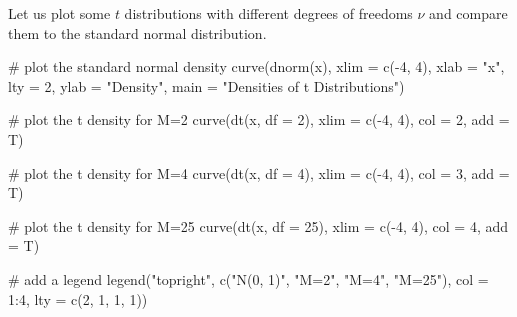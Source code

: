 \documentclass[
  letterpaper,
  DIV=11,
  numbers=noendperiod]{scrreprt}
\newenvironment{Shaded}{\begin{snugshade}}{\end{snugshade}}
\newcommand{\AttributeTok}[1]{\textcolor[rgb]{0.40,0.45,0.13}{#1}}
\newcommand{\CommentTok}[1]{\textcolor[rgb]{0.37,0.37,0.37}{#1}}
\newcommand{\DecValTok}[1]{\textcolor[rgb]{0.68,0.00,0.00}{#1}}
\newcommand{\FunctionTok}[1]{\textcolor[rgb]{0.28,0.35,0.67}{#1}}
\newcommand{\NormalTok}[1]{\textcolor[rgb]{0.00,0.23,0.31}{#1}}
\newcommand{\SpecialCharTok}[1]{\textcolor[rgb]{0.37,0.37,0.37}{#1}}
\newcommand{\StringTok}[1]{\textcolor[rgb]{0.13,0.47,0.30}{#1}}
\theoremstyle{definition}
\theoremstyle{plain}
\theoremstyle{plain}
\theoremstyle{remark}
\begin{document}
Let us plot some \(t\) distributions with different degrees of freedoms
\(\nu\) and compare them to the standard normal distribution.

\begin{Shaded}
\begin{Highlighting}[]
\CommentTok{\# plot the standard normal density}
\FunctionTok{curve}\NormalTok{(}\FunctionTok{dnorm}\NormalTok{(x), }
      \AttributeTok{xlim =} \FunctionTok{c}\NormalTok{(}\SpecialCharTok{{-}}\DecValTok{4}\NormalTok{, }\DecValTok{4}\NormalTok{), }
      \AttributeTok{xlab =} \StringTok{"x"}\NormalTok{, }
      \AttributeTok{lty =} \DecValTok{2}\NormalTok{, }
      \AttributeTok{ylab =} \StringTok{"Density"}\NormalTok{, }
      \AttributeTok{main =} \StringTok{"Densities of t Distributions"}\NormalTok{)}

\CommentTok{\# plot the t density for M=2}
\FunctionTok{curve}\NormalTok{(}\FunctionTok{dt}\NormalTok{(x, }\AttributeTok{df =} \DecValTok{2}\NormalTok{), }
      \AttributeTok{xlim =} \FunctionTok{c}\NormalTok{(}\SpecialCharTok{{-}}\DecValTok{4}\NormalTok{, }\DecValTok{4}\NormalTok{), }
      \AttributeTok{col =} \DecValTok{2}\NormalTok{, }
      \AttributeTok{add =}\NormalTok{ T)}

\CommentTok{\# plot the t density for M=4}
\FunctionTok{curve}\NormalTok{(}\FunctionTok{dt}\NormalTok{(x, }\AttributeTok{df =} \DecValTok{4}\NormalTok{), }
      \AttributeTok{xlim =} \FunctionTok{c}\NormalTok{(}\SpecialCharTok{{-}}\DecValTok{4}\NormalTok{, }\DecValTok{4}\NormalTok{), }
      \AttributeTok{col =} \DecValTok{3}\NormalTok{, }
      \AttributeTok{add =}\NormalTok{ T)}

\CommentTok{\# plot the t density for M=25}
\FunctionTok{curve}\NormalTok{(}\FunctionTok{dt}\NormalTok{(x, }\AttributeTok{df =} \DecValTok{25}\NormalTok{), }
      \AttributeTok{xlim =} \FunctionTok{c}\NormalTok{(}\SpecialCharTok{{-}}\DecValTok{4}\NormalTok{, }\DecValTok{4}\NormalTok{), }
      \AttributeTok{col =} \DecValTok{4}\NormalTok{, }
      \AttributeTok{add =}\NormalTok{ T)}

\CommentTok{\# add a legend}
\FunctionTok{legend}\NormalTok{(}\StringTok{"topright"}\NormalTok{, }
       \FunctionTok{c}\NormalTok{(}\StringTok{"N(0, 1)"}\NormalTok{, }\StringTok{"M=2"}\NormalTok{, }\StringTok{"M=4"}\NormalTok{, }\StringTok{"M=25"}\NormalTok{), }
       \AttributeTok{col =} \DecValTok{1}\SpecialCharTok{:}\DecValTok{4}\NormalTok{, }
       \AttributeTok{lty =} \FunctionTok{c}\NormalTok{(}\DecValTok{2}\NormalTok{, }\DecValTok{1}\NormalTok{, }\DecValTok{1}\NormalTok{, }\DecValTok{1}\NormalTok{))}
\end{Highlighting}
\end{Shaded}
\end{document}
